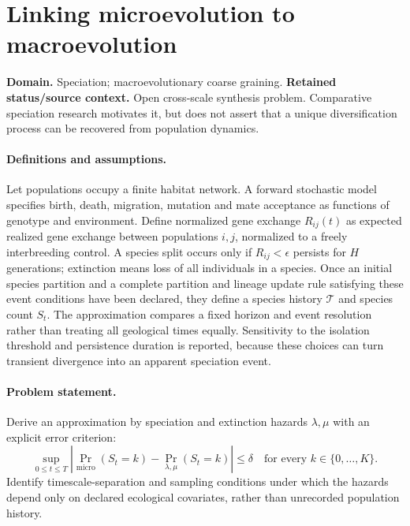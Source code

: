 \documentclass[11pt]{article}
\begin{document}
\section*{Linking microevolution to macroevolution}
\label{prob:160}
\label{rank:33}
\par\smallskip

\noindent\textbf{Domain.} Speciation; macroevolutionary coarse graining. \quad \textbf{Retained status/source context.} Open cross-scale synthesis problem. Comparative speciation research motivates it, but does not assert that a unique diversification process can be recovered from population dynamics.
\paragraph{Definitions and assumptions.} Let populations occupy a finite habitat network. A forward stochastic model specifies birth, death, migration, mutation and mate acceptance as functions of genotype and environment. Define normalized gene exchange $R_{ij}(t)$ as expected realized gene exchange between populations $i,j$, normalized to a freely interbreeding control. A species split occurs only if $R_{ij}<\epsilon$ persists for $H$ generations; extinction means loss of all individuals in a species. Once an initial species partition and a complete partition and lineage update rule satisfying these event conditions have been declared, they define a species history $\mathcal T$ and species count $S_t$. The approximation compares a fixed horizon and event resolution rather than treating all geological times equally. Sensitivity to the isolation threshold and persistence duration is reported, because these choices can turn transient divergence into an apparent speciation event.
\paragraph{Problem statement.} Derive an approximation by speciation and extinction hazards $\lambda,\mu$ with an explicit error criterion:
\[
 \sup_{0\le t\le T}
 \left|\Pr_{\mathrm{micro}}(S_t=k)-\Pr_{\lambda,\mu}(S_t=k)\right|
 \le\delta\quad\text{for every }k\in\{0,\ldots,K\}.
\]
Identify timescale-separation and sampling conditions under which the hazards depend only on declared ecological covariates, rather than unrecorded population history.
\end{document}
